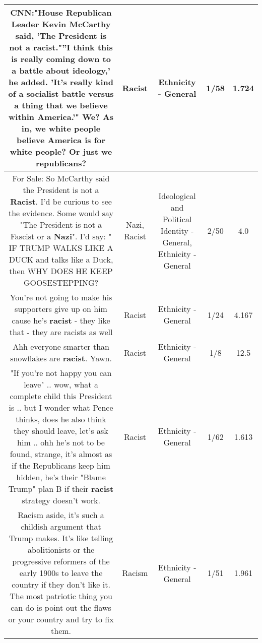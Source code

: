 \documentclass[11pt]{article}
\newlength\mylength
\begin{document}
\begin{center}
\begin{longtable}{|C{.65\mylength}|C{.30\mylength}|C{.12\mylength}|C{.12\mylength}|C{.12\mylength}|}
  \small CNN:"House Republican Leader Kevin McCarthy said, 'The President is not a \textbf{racist}."''I think this is really coming down to a battle about ideology,' he added. 'It's really kind of a socialist battle versus a thing that we believe within America.'"  We?  As in, we white people believe America is for white people?  Or just we republicans?\normalsize   & Racist & Ethnicity - General & 1/58 & 1.724 \\  \hline
  \small For Sale: So McCarthy said the President is not a \textbf{Racist}.   I'd be curious to see the evidence.  Some would say "The President is not a Fascist or a \textbf{Nazi}". I'd say:     " IF TRUMP  WALKS LIKE A DUCK  and talks like a Duck, then  WHY DOES HE KEEP GOOSESTEPPING?\normalsize   & Nazi, Racist &  Ideological and Political Identity - General, Ethnicity - General & 2/50 & 4.0 \\  \hline
  \small You're not going to make his supporters give up on him cause he's \textbf{racist} - they like that - they are racists as well\normalsize   & Racist & Ethnicity - General & 1/24 & 4.167 \\  \hline
  \small Ahh everyone smarter than snowflakes are \textbf{racist}. Yawn.\normalsize   & Racist & Ethnicity - General & 1/8 & 12.5 \\  \hline
  \small "If you're not happy you can leave" .. wow, what a complete child this President is .. but I wonder what Pence thinks, does he also think they should leave, let's ask him .. ohh he's not to be found, strange, it's almost as if the Republicans keep him hidden, he's their "Blame Trump" plan B if their \textbf{racist} strategy doesn't work.\normalsize   & Racist & Ethnicity - General & 1/62 & 1.613 \\  \hline
  \small Racism aside, it's such a childish argument that Trump makes. It's like telling abolitionists or the progressive reformers of the early 1900s to leave the country if they don't like it. The most patriotic thing you can do is point out the flaws or your country and try to fix them.\normalsize   & Racism & Ethnicity - General & 1/51 & 1.961 \\  \hline

\end{longtable}
\end{center}
\end{document}
